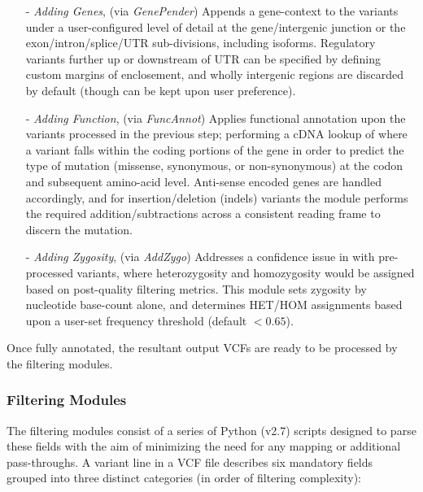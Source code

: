 \documentclass{bioinfo}
\begin{document}
\begin{methods}
\begin{itemize}
\item[-]{\it Adding Genes}{, (via \textit{GenePender}) Appends a gene-context to the variants under a user-configured level of detail at the gene/intergenic junction or the exon/intron/splice/UTR sub-divisions, including isoforms. Regulatory variants further up or downstream of UTR can be specified by defining custom margins of enclosement, and wholly intergenic regions are discarded by default (though can be kept upon user preference). 
}
\item[-]{\it Adding Function}{, (via \textit{FuncAnnot}) Applies functional annotation upon the variants processed in the previous step; performing a cDNA lookup of where a variant falls within the coding portions of the gene in order to predict the type of mutation (missense, synonymous, or non-synonymous) at the codon and subsequent amino-acid level. Anti-sense encoded genes are handled accordingly, and for insertion/deletion (indels) variants the module performs the required addition/subtractions across a consistent reading frame to discern the mutation.
}
\item[-]{\it Adding Zygosity}{, (via \textit{AddZygo}) Addresses a confidence issue in with pre-processed variants, where heterozygosity and homozygosity would be assigned based on post-quality filtering metrics. This module sets zygosity by nucleotide base-count alone, and determines HET/HOM assignments based upon a user-set frequency threshold (default $<0.65$).
}
\end{itemize}

Once fully annotated, the resultant output VCFs are ready to be processed by the filtering modules.



\subsubsection{Filtering Modules}

The filtering modules consist of a series of Python (v2.7) scripts designed to parse these fields with the aim of minimizing the need for any mapping or additional pass-throughs. A variant line in a VCF file describes six mandatory fields grouped into three distinct categories (in order of filtering complexity):


\end{methods}
\end{document}
